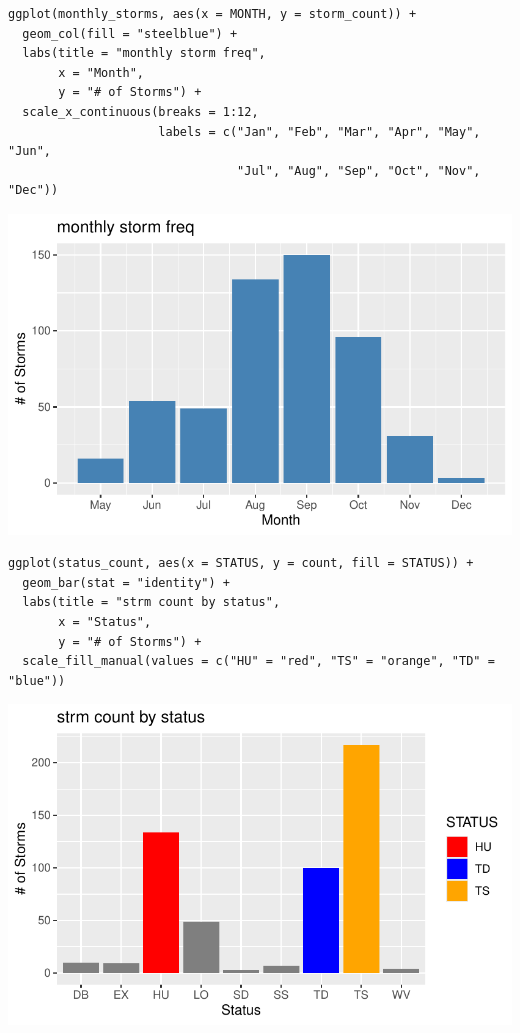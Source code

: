 \documentclass[12pt,letterpaper]{article}
\begin{document}
\begin{verbatim}
ggplot(monthly_storms, aes(x = MONTH, y = storm_count)) +
  geom_col(fill = "steelblue") +
  labs(title = "monthly storm freq",
       x = "Month",
       y = "# of Storms") +
  scale_x_continuous(breaks = 1:12,
                     labels = c("Jan", "Feb", "Mar", "Apr", "May", "Jun", 
                                "Jul", "Aug", "Sep", "Oct", "Nov", "Dec"))
\end{verbatim}

\includegraphics{GroupTask3_files/figure-pdf/Plots-2.pdf}

\begin{verbatim}
ggplot(status_count, aes(x = STATUS, y = count, fill = STATUS)) +
  geom_bar(stat = "identity") +
  labs(title = "strm count by status",
       x = "Status",
       y = "# of Storms") +
  scale_fill_manual(values = c("HU" = "red", "TS" = "orange", "TD" = "blue"))
\end{verbatim}

\includegraphics{GroupTask3_files/figure-pdf/Plots-3.pdf}
\end{document}
